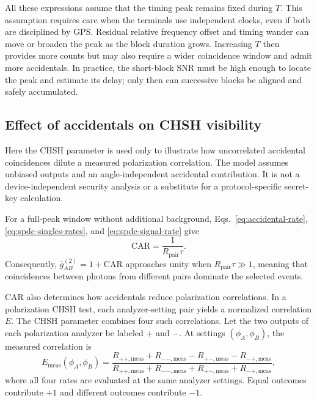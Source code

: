 \documentclass[a4paper,10pt]{article}
\begin{document}
All these expressions assume that the timing peak remains fixed during $T$.  This assumption requires care when the terminals use independent clocks, even if both are disciplined by GPS.  Residual relative frequency offset and timing wander can move or broaden the peak as the block duration grows.  Increasing $T$ then provides more counts but may also require a wider coincidence window and admit more accidentals.  In practice, the short-block SNR must be high enough to locate the peak and estimate its delay; only then can successive blocks be aligned and safely accumulated.

\subsection{Effect of accidentals on CHSH visibility}

Here the CHSH parameter is used only to illustrate how uncorrelated accidental coincidences dilute a measured polarization correlation.  The model assumes unbiased outputs and an angle-independent accidental contribution.  It is not a device-independent security analysis or a substitute for a protocol-specific secret-key calculation.

For a full-peak window without additional background, Eqs.~\eqref{eq:accidental-rate}, \eqref{eq:spdc-singles-rates}, and \eqref{eq:spdc-signal-rate} give
\begin{equation}
    \label{eq:full-peak-car}
    \mathrm{CAR}
    =\frac{1}{R_{\mathrm{pair}}\tau}.
\end{equation}
Consequently, $\overline{g}^{(2)}_{AB}=1+\mathrm{CAR}$ approaches unity when $R_{\mathrm{pair}}\tau\gg1$, meaning that coincidences between photons from different pairs dominate the selected events.

CAR also determines how accidentals reduce polarization correlations.  In a polarization CHSH test, each analyzer-setting pair yields a normalized correlation $E$.  The CHSH parameter combines four such correlations.  Let the two outputs of each polarization analyzer be labeled $+$ and $-$.  At settings $(\phi_A,\phi_B)$, the measured correlation is
\begin{equation}
    E_{\mathrm{meas}}(\phi_A,\phi_B)
    =\frac{
       R_{++,\mathrm{meas}}+R_{--,\mathrm{meas}}
       -R_{+-,\mathrm{meas}}-R_{-+,\mathrm{meas}}}
      {R_{++,\mathrm{meas}}+R_{--,\mathrm{meas}}
       +R_{+-,\mathrm{meas}}+R_{-+,\mathrm{meas}}},
\end{equation}
where all four rates are evaluated at the same analyzer settings.  Equal outcomes contribute $+1$ and different outcomes contribute $-1$.
\end{document}
